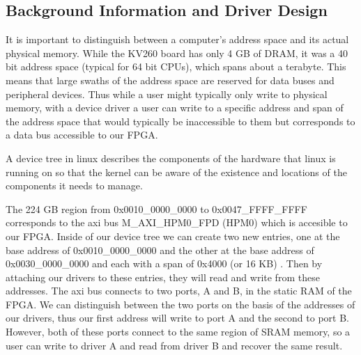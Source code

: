 \documentclass[psamsfonts]{amsart}
\theoremstyle{definition}
\theoremstyle{remark}
\numberwithin{equation}{section}
\begin{document}
\subsection{Background Information and Driver Design}
It is important to distinguish between a computer's address space and its actual physical memory. While the KV260 board has only 4 GB of DRAM, it was a 40 bit address space (typical for 64 bit CPUs), which spans about a terabyte. This means that large swaths of the address space are reserved for data buses and peripheral devices. Thus while a user might typically only write to physical memory, with a device driver a user can write to a specific address and span of the address space that would typically be inaccessible to them but corresponds to a data bus accessible to our FPGA.

A device tree in linux describes the components of the hardware that linux is running on so that the kernel can be aware of the existence and locations of the components it needs to manage.

The 224 GB region from 0x0010\_0000\_0000 to 0x0047\_FFFF\_FFFF corresponds to the axi bus M\_AXI\_HPM0\_FPD (HPM0) which is accesible to our FPGA. Inside of our device tree we can create two new entries, one at the base address of 0x0010\_0000\_0000 and the other at the base address of 0x0030\_0000\_0000 and each with a span of 0x4000 (or 16 KB) \cite{zynq-doc}. Then by attaching our drivers to these entries, they will read and write from these addresses. The axi bus connects to two ports, A and B, in the static RAM of the FPGA. We can distinguish between the two ports on the basis of the addresses of our drivers, thus our first address will write to port A and the second to port B. However, both of these ports connect to the same region of SRAM memory, so a user can write to driver A and read from driver B and recover the same result.
\end{document}
